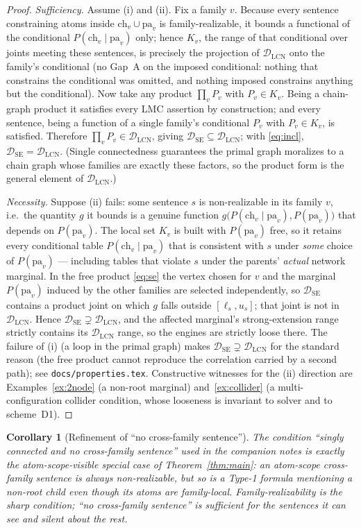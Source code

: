 \documentclass[11pt]{article}
\newtheorem{corollary}{Corollary}
\newcommand{\DSE}{\mathcal{D}_{\mathrm{SE}}}
\newcommand{\DLCN}{\mathcal{D}_{\mathrm{LCN}}}
\newcommand{\ch}{\mathrm{ch}}
\newcommand{\pa}{\mathrm{pa}}
\begin{document}
\begin{proof}
\emph{Sufficiency.} Assume (i) and (ii). Fix a family $v$. Because every sentence constraining atoms
inside $\ch_v\cup\pa_v$ is family-realizable, it bounds a functional of the conditional
$P(\ch_v\mid\pa_v)$ only; hence $K_v$, the range of that conditional over joints meeting these
sentences, is precisely the projection of $\DLCN$ onto the family's conditional (no Gap~A on the
imposed conditional: nothing that constrains the conditional was omitted, and nothing imposed
constrains anything but the conditional). Now take any product $\prod_v P_v$ with $P_v\in K_v$. Being a
chain-graph product it satisfies every LMC assertion by construction; and every sentence, being a
function of a single family's conditional $P_v$ with $P_v\in K_v$, is satisfied. Therefore
$\prod_v P_v\in\DLCN$, giving $\DSE\subseteq\DLCN$; with \eqref{eq:incl}, $\DSE=\DLCN$. (Single
connectedness guarantees the primal graph moralizes to a chain graph whose families are exactly these
factors, so the product form is the general element of $\DLCN$.)

\emph{Necessity.} Suppose (ii) fails: some sentence $s$ is non-realizable in its family $v$, i.e.\ the
quantity $g$ it bounds is a genuine function $g\bigl(P(\ch_v\mid\pa_v),P(\pa_v)\bigr)$ that depends on
$P(\pa_v)$. The local set $K_v$ is built with $P(\pa_v)$ free, so it retains every conditional table
$P(\ch_v\mid\pa_v)$ that is consistent with $s$ under \emph{some} choice of $P(\pa_v)$ --- including
tables that violate $s$ under the parents' \emph{actual} network marginal. In the free product
\eqref{eq:se} the vertex chosen for $v$ and the marginal $P(\pa_v)$ induced by the other families are
selected independently, so $\DSE$ contains a product joint on which $g$ falls outside $[\ell_s,u_s]$;
that joint is not in $\DLCN$. Hence $\DSE\supsetneq\DLCN$, and the affected marginal's
strong-extension range strictly contains its $\DLCN$ range, so the engines are strictly loose there.
The failure of (i) (a loop in the primal graph) makes $\DSE\supsetneq\DLCN$ for the standard reason
(the free product cannot reproduce the correlation carried by a second path); see
\texttt{docs/properties.tex}. Constructive witnesses for the (ii) direction are
Examples~\ref{ex:2node} (a non-root marginal) and~\ref{ex:collider} (a multi-configuration collider
condition, whose looseness is invariant to solver and to scheme~D1).
\end{proof}

\begin{corollary}[Refinement of ``no cross-family sentence'']\label{cor:refine}
The condition ``singly connected and no cross-family sentence'' used in the companion notes is exactly
the atom-scope-visible special case of Theorem~\ref{thm:main}: an atom-scope cross-family sentence is
always non-realizable, but so is a Type-1 formula mentioning a non-root child even though its atoms are
family-local. Family-realizability is the sharp condition; ``no cross-family sentence'' is sufficient
for the sentences it can see and silent about the rest.
\end{corollary}
\end{document}
